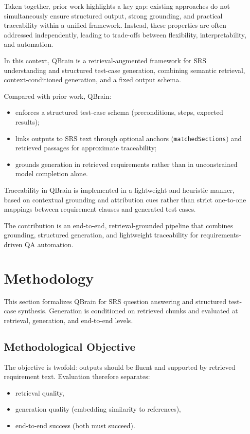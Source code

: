 \documentclass[conference]{IEEEtran}
\begin{document}
Taken together, prior work highlights a key gap: existing approaches do not simultaneously ensure structured output, strong grounding, and practical traceability within a unified framework. Instead, these properties are often addressed independently, leading to trade-offs between flexibility, interpretability, and automation.

In this context, QBrain is a retrieval-augmented framework for SRS understanding and structured test-case generation, combining semantic retrieval, context-conditioned generation, and a fixed output schema.

Compared with prior work, QBrain:
\begin{itemize}
\item enforces a structured test-case schema (preconditions, steps, expected results);
\item links outputs to SRS text through optional anchors (\texttt{matchedSections}) and retrieved passages for approximate traceability;
\item grounds generation in retrieved requirements rather than in unconstrained model completion alone.
\end{itemize}

Traceability in QBrain is implemented in a lightweight and heuristic manner, based on contextual grounding and attribution cues rather than strict one-to-one mappings between requirement clauses and generated test cases.

The contribution is an end-to-end, retrieval-grounded pipeline that combines grounding, structured generation, and lightweight traceability for requirements-driven QA automation.

\section{Methodology}
\label{sec:methodology}

This section formalizes QBrain for SRS question answering and structured test-case synthesis. Generation is conditioned on retrieved chunks and evaluated at retrieval, generation, and end-to-end levels.

\subsection{Methodological Objective}

The objective is twofold: outputs should be fluent and supported by retrieved requirement text. Evaluation therefore separates:
\begin{itemize}
    \item retrieval quality,
    \item generation quality (embedding similarity to references),
    \item end-to-end success (both must succeed).
\end{itemize}
\end{document}

